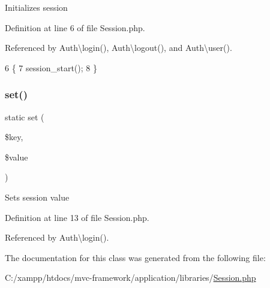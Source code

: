 Initializes session 

Definition at line 6 of file Session.\+php.



Referenced by Auth\textbackslash{}login(), Auth\textbackslash{}logout(), and Auth\textbackslash{}user().


\begin{DoxyCode}
6                                   \{
7         session\_start();
8     \}
\end{DoxyCode}
\hypertarget{class_session_aa485369b2925858d92e468d405bd0798}{}\label{class_session_aa485369b2925858d92e468d405bd0798} 
\subsubsection{\texorpdfstring{set()}{set()}}
{\footnotesize\ttfamily static set (\begin{DoxyParamCaption}\item[{}]{\$key,  }\item[{}]{\$value }\end{DoxyParamCaption})\hspace{0.3cm}{\ttfamily [static]}}

Sets session value 

Definition at line 13 of file Session.\+php.



Referenced by Auth\textbackslash{}login().




The documentation for this class was generated from the following file\+:\begin{DoxyCompactItemize}
\item 
C\+:/xampp/htdocs/mvc-\/framework/application/libraries/\hyperlink{_session_8php}{Session.\+php}\end{DoxyCompactItemize}
